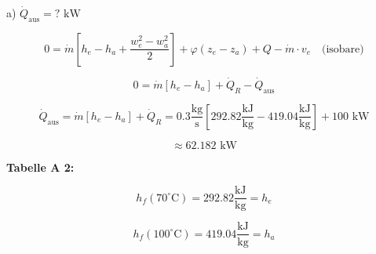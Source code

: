 a) $\dot{Q}_{\text{aus}} = ? \text{ kW}$

\[
0 = \dot{m} \left[ h_e - h_a + \frac{w_e^2 - w_a^2}{2} \right] + \varphi (z_e - z_a) + Q - \dot{m} \cdot v_e \quad \text{(isobare)}
\]

\[
0 = \dot{m} \left[ h_e - h_a \right] + \dot{Q}_R - \dot{Q}_{\text{aus}}
\]

\[
\dot{Q}_{\text{aus}} = \dot{m} \left[ h_e - h_a \right] + \dot{Q}_R = 0.3 \frac{\text{kg}}{\text{s}} \left[ 292.82 \frac{\text{kJ}}{\text{kg}} - 419.04 \frac{\text{kJ}}{\text{kg}} \right] + 100 \text{ kW}
\]

\[
\approx 62.182 \text{ kW}
\]

\textbf{Tabelle A 2:}

\[
h_f (70^\circ \text{C}) = 292.82 \frac{\text{kJ}}{\text{kg}} = h_e
\]

\[
h_f (100^\circ \text{C}) = 419.04 \frac{\text{kJ}}{\text{kg}} = h_a
\]